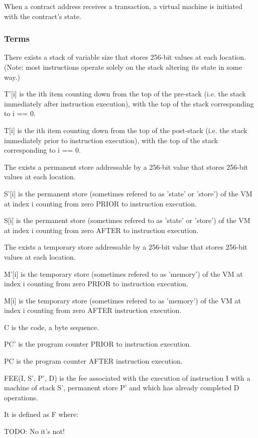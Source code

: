 \documentclass[9pt,oneside]{amsart}
\begin{document}
\begin{multicols}{2}
When a contract address receives a transaction, a virtual machine is initiated with the contract's state.

\subsubsection{Terms}

There exists a stack of variable size that stores 256-bit values at each location. (Note: most instructions operate solely on the stack altering its state in some way.)

T'[i] is the ith item counting down from the top of the pre-stack (i.e. the stack immediately after instruction execution), with the top of the stack corresponding to i == 0.

T[i] is the ith item counting down from the top of the post-stack (i.e. the stack immediately prior to instruction execution), with the top of the stack corresponding to i == 0.


The exists a permanent store addressable by a 256-bit value that stores 256-bit values at each location.

S'[i] is the permanent store (sometimes refered to as 'state' or 'store') of the VM at index i counting from zero PRIOR to instruction execution.

S[i] is the permanent store (sometimes refered to as 'state' or 'store') of the VM at index i counting from zero AFTER to instruction execution.


The exists a temporary store addressable by a 256-bit value that stores 256-bit values at each location.

M'[i] is the temporary store (sometimes refered to as 'memory') of the VM at index i counting from zero PRIOR to instruction execution.

M[i] is the temporary store (sometimes refered to as 'memory') of the VM at index i counting from zero AFTER instruction execution.

C is the code, a byte sequence.

PC' is the program counter PRIOR to instruction execution.

PC is the program counter AFTER instruction execution.


FEE(I, S', P', D) is the fee associated with the execution of instruction I with a machine of stack S', permanent store P' and which has already completed D operations.

It is defined as F where:

TODO: No it's not!


\end{multicols}
\end{document}
